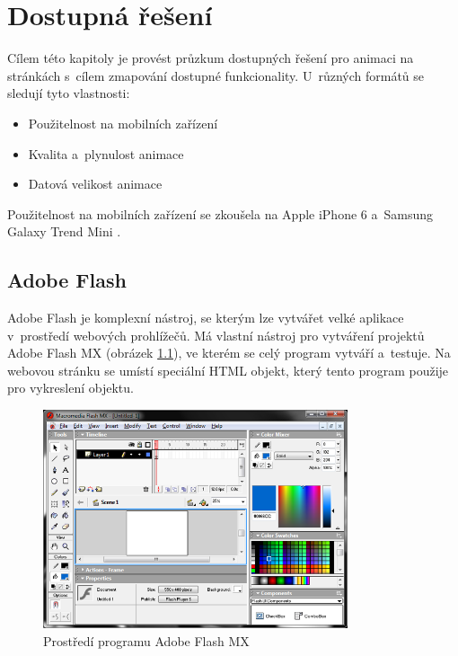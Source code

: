 \chapter{Dostupná řešení}


Cílem této kapitoly  je provést průzkum dostupných řešení pro animaci na stránkách s~cílem zmapování dostupné funkcionality. U~různých formátů se sledují tyto vlastnosti:

\begin{itemize}
\item Použitelnost na mobilních zařízení
\item Kvalita a~plynulost animace
\item Datová velikost animace
\end{itemize}

Použitelnost na mobilních zařízení se zkoušela na Apple iPhone 6\cite{iphone5} a~Samsung Galaxy Trend Mini \cite{samsung}.


\section{Adobe Flash}

Adobe Flash\cite{flash} je komplexní nástroj, se kterým lze vytvářet velké aplikace v~prostředí webových prohlížečů. Má vlastní nástroj pro vytváření projektů Adobe Flash MX (obrázek \ref{fig:flash-ui}), ve kterém se celý program vytváří a~testuje. Na webovou stránku se umístí  speciální HTML\cite{html5video} objekt, který tento program použije pro vykreslení objektu.


\begin{figure}[h]
\centering
\includegraphics[width=0.8\textwidth]{./figures/flash-ui.png}
\caption{Prostředí programu Adobe Flash MX}
\label{fig:flash-ui}
\end{figure}



